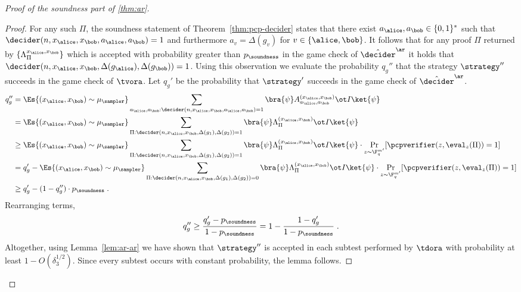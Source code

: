 \begin{proof}[Proof of the soundness part of \cref{thm:ar}]
\begin{proof}
  For any such $\Pi$, the soundness statement of Theorem~\ref{thm:pcp-decider}
  states that there exist $a_\alice, a_\bob \in \{0,1\}^*$ such that
  $\decider(n, {x}_\alice, {x}_\bob, a_\alice, a_\bob) = 1$ and furthermore
  $a_v = \Delta(g_v)$ for $v \in \{\alice,\bob\}$.   
It follows that for any proof $\Pi$ returned by
  $\{\Lambda^{{x}_\alice,{x}_\bob}_\Pi\}$ which is accepted with probability
  greater than $p_{\soundness}$ in the game check of $\tdans$ it holds
  that $\decider(n, {x}_\alice, {x}_\bob, \Delta(g_\alice), \Delta(g_\bob)) =
  1$.
  Using this observation we evaluate the probability $q_g''$ that the strategy
  $\strategy''$ succeeds in the game check of $\tvora$.
  Let $q_g'$ be the probability that $\strategy'$ succeeds in the game check of
  $\tdans$.
  \begin{align*}
    q_g'' &= \Es{({x}_\alice,{x}_\bob) \sim \mu_{\sampler}} \sum_{a_\alice,
            a_\bob: \decider(n,{x}_\alice,{x}_\bob, a_\alice, a_\bob) = 1}
            \bra{\psi} A^{({x}_\alice,{x}_\bob)}_{a_\alice, a_\bob} \ot I
            \ket{\psi}    \\
          &= \Es{({x}_\alice,{x}_\bob) \sim \mu_{\sampler}} \sum_{\Pi
            : \decider(n,{x}_\alice,{x}_\bob, \Delta(g_1), \Delta(g_2)) = 1}
            \bra{\psi} \Lambda^{({x}_\alice,{x}_\bob)}_{\Pi} \ot I
            \ket{\psi} \\
          &\geq \Es{({x}_\alice,{x}_\bob) \sim \mu_{\sampler}} \sum_{\Pi
            : \decider(n,{x}_\alice,{x}_\bob, \Delta(g_1), \Delta(g_2)) = 1}
            \bra{\psi} \Lambda^{({x}_\alice,{x}_\bob)}_{\Pi} \ot I
            \ket{\psi} \cdot \Pr_{z \sim \F_q^{m'}} [
            \pcpverifier(z,\eval_z(\Pi)) = 1]\\
          &= q_g' -  \Es{({x}_\alice,{x}_\bob) \sim \mu_{\sampler}} \sum_{\Pi
            : \decider(n,{x}_\alice,{x}_\bob, \Delta(g_1), \Delta(g_2)) = 0}
            \bra{\psi} \Lambda^{({x}_\alice,{x}_\bob)}_{\Pi} \ot I
            \ket{\psi} \cdot \Pr_{z \sim \F_q^{m'}} [
            \pcpverifier(z,\eval_z(\Pi))= 1] \\
          &\geq q_g' - ( 1- q_g'')\cdot
            p_{\soundness} \;.
  \end{align*}
  Rearranging terms,
  \begin{equation}
    q_g'' \geq \frac{q_g' - p_{\soundness}}{1 - p_{\soundness}} 
    = 1 - \frac{1-q_g'}{1 - p_{\soundness}}\;. \label{eq:pgameora}
  \end{equation}
  Altogether, using Lemma~\ref{lem:ar-ar} we have shown that $\strategy''$ is
  accepted in each subtest performed by $\tdora$ with probability at
  least $1 - O(\delta_3^{1/2})$.
  Since every subtest occurs with constant probability, the lemma follows.
  \end{proof}
	

\end{proof}
